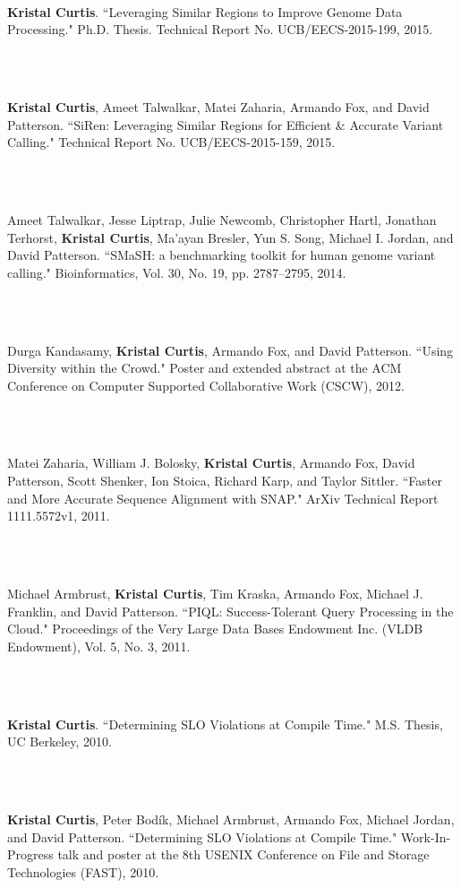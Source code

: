 \documentclass[11pt]{article}
\newcommand{\pagewidth}{6.8 in}
\newcommand{\tabwidth}{1.5 in}
\begin{document}
\begin{tabbing}
\hspace{\tabwidth} \= \\ 

\parbox[t]{\pagewidth}{\textbf{Kristal Curtis}.  ``Leveraging Similar Regions to Improve Genome Data Processing."  Ph.D. Thesis. Technical Report No. UCB/EECS-2015-199, 2015.}\\ \\
\parbox[t]{\pagewidth}{\textbf{Kristal Curtis}, Ameet Talwalkar, Matei Zaharia, Armando Fox, and David Patterson.  ``SiRen:  Leveraging Similar Regions for Efficient \& Accurate Variant Calling."  Technical Report No. UCB/EECS-2015-159, 2015.}\\ \\
\parbox[t]{\pagewidth}{Ameet Talwalkar, Jesse Liptrap, Julie Newcomb, Christopher Hartl, Jonathan Terhorst, \textbf{Kristal Curtis}, Ma'ayan Bresler, Yun S. Song, Michael I. Jordan, and David Patterson.  ``SMaSH:  a benchmarking toolkit for human genome variant calling."  Bioinformatics, Vol. 30, No. 19, pp. 2787--2795, 2014.}\\ \\
\parbox[t]{\pagewidth}{Durga Kandasamy, \textbf{Kristal Curtis}, Armando Fox, and David Patterson.  ``Using Diversity within the Crowd."  Poster and extended abstract at the ACM Conference on Computer Supported Collaborative Work (CSCW), 2012.}\\ \\
\parbox[t]{\pagewidth}{Matei Zaharia, William J. Bolosky, \textbf{Kristal Curtis}, Armando Fox, David Patterson, Scott Shenker, Ion Stoica, Richard Karp, and Taylor Sittler.  ``Faster and More Accurate Sequence Alignment with SNAP."  ArXiv Technical Report 1111.5572v1, 2011.}\\ \\
\parbox[t]{\pagewidth}{Michael Armbrust, \textbf{Kristal Curtis}, Tim Kraska, Armando Fox, Michael J. Franklin, and David Patterson.  ``PIQL:  Success-Tolerant Query Processing in the Cloud."  Proceedings of the Very Large Data Bases Endowment Inc. (VLDB Endowment), Vol. 5, No. 3, 2011.}\\ \\
\parbox[t]{\pagewidth}{\textbf{Kristal Curtis}.  ``Determining SLO Violations at Compile Time."  M.S. Thesis, UC Berkeley, 2010.}\\ \\
\parbox[t]{\pagewidth}{\textbf{Kristal Curtis}, Peter Bod\'{i}k, Michael Armbrust, Armando Fox, Michael Jordan, and David Patterson.  ``Determining SLO Violations at Compile Time."  Work-In-Progress talk and poster at the 8th USENIX Conference on File and Storage Technologies (FAST), 2010.}\\ \\

\end{tabbing}
\end{document}
